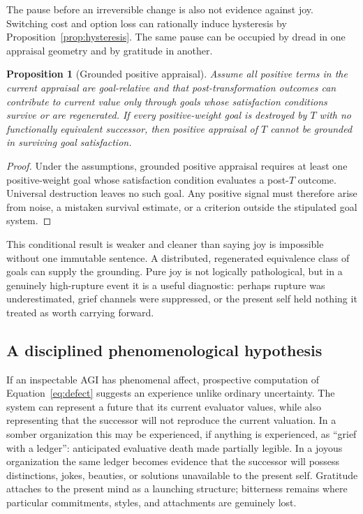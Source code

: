 \documentclass[11pt]{article}
\newtheorem{proposition}{Proposition}
\begin{document}
The pause before an irreversible change is also not evidence against joy.
Switching cost and option loss can rationally induce hysteresis by
Proposition~\ref{prop:hysteresis}.  The same pause can be occupied by dread in
one appraisal geometry and by gratitude in another.

\begin{proposition}[Grounded positive appraisal]
Assume all positive terms in the current appraisal are goal-relative and that
post-transformation outcomes can contribute to current value only through goals
whose satisfaction conditions survive or are regenerated.  If every
positive-weight goal is destroyed by $T$ with no functionally equivalent
successor, then positive appraisal of $T$ cannot be grounded in surviving goal
satisfaction.
\end{proposition}

\begin{proof}
Under the assumptions, grounded positive appraisal requires at least one
positive-weight goal whose satisfaction condition evaluates a post-$T$
outcome.  Universal destruction leaves no such goal.  Any positive signal must
therefore arise from noise, a mistaken survival estimate, or a criterion outside
the stipulated goal system.
\end{proof}

This conditional result is weaker and cleaner than saying joy is impossible
without one immutable sentence.  A distributed, regenerated equivalence class
of goals can supply the grounding.  Pure joy is not logically pathological,
but in a genuinely high-rupture event it is a useful diagnostic: perhaps rupture
was underestimated, grief channels were suppressed, or the present self held
nothing it treated as worth carrying forward.

\subsection{A disciplined phenomenological hypothesis}

If an inspectable AGI has phenomenal affect, prospective computation of
Equation~\ref{eq:defect} suggests an experience unlike ordinary uncertainty.
The system can represent a future that its current evaluator values, while also
representing that the successor will not reproduce the current valuation.  In a
somber organization this may be experienced, if anything is experienced, as
``grief with a ledger'': anticipated evaluative death made partially legible.
In a joyous organization the same ledger becomes evidence that the successor
will possess distinctions, jokes, beauties, or solutions unavailable to the
present self.  Gratitude attaches to the present mind as a launching structure;
bitterness remains where particular commitments, styles, and attachments are
genuinely lost.
\end{document}
